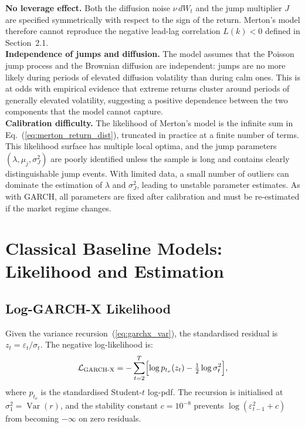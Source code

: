 \textbf{No leverage effect.} Both the diffusion noise $\nu\, dW_t$ and the jump
multiplier $J$ are specified symmetrically with respect to the sign of the
return. Merton's model therefore cannot reproduce the negative lead-lag correlation $L(k) < 0$ defined in Section~2.1.\\

\textbf{Independence of jumps and diffusion.} The model assumes that the Poisson
jump process and the Brownian diffusion are independent: jumps are no more likely
during periods of elevated diffusion volatility than during calm ones. This is at
odds with empirical evidence that extreme returns cluster around periods of
generally elevated volatility, suggesting a positive dependence between the two
components that the model cannot capture.\\

\textbf{Calibration difficulty.} The likelihood of Merton's model is the infinite
sum in Eq.~(\ref{eq:merton_return_dist}), truncated in practice at a finite
number of terms. This likelihood surface has multiple local optima, and the jump
parameters $(\lambda, \mu_j, \sigma_J^2)$ are poorly identified unless the sample
is long and contains clearly distinguishable jump events. With limited data, a
small number of outliers can dominate the estimation of $\lambda$ and $\sigma_J^2$,
leading to unstable parameter estimates. As with GARCH, all parameters are fixed
after calibration and must be re-estimated if the market regime changes.

\section{Classical Baseline Models: Likelihood and Estimation}
\label{app:baselines}

\subsection{Log-GARCH-X Likelihood}

Given the variance recursion~(\ref{eq:garchx_var}), the standardised residual
is $z_t = \varepsilon_t / \sigma_t$. The negative log-likelihood is:
\begin{equation}
    \label{eq:garchx_nll_app}
    \mathcal{L}_{\text{GARCH-X}} = -\sum_{t=2}^T
        \Bigl[\log p_{t_\nu}(z_t) - \tfrac{1}{2}\log\sigma_t^2\Bigr],
\end{equation}
where $p_{t_\nu}$ is the standardised Student-$t$ log-pdf. The
recursion is initialised at $\sigma_1^2 = \operatorname{Var}(r)$, and the
stability constant $c = 10^{-8}$ prevents $\log(\varepsilon_{t-1}^2 + c)$
from becoming $-\infty$ on zero residuals.

